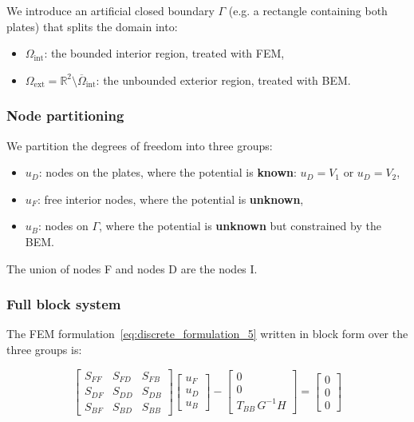 \documentclass[11pt,onecolumn]{article}
\begin{document}
We introduce an artificial closed boundary $\Gamma$ (e.g. a rectangle containing both plates) 
that splits the domain into:
\begin{itemize}
    \item $\Omega_{\text{int}}$: the bounded interior region, treated with FEM,
    \item $\Omega_{\text{ext}} = \mathbb{R}^2 \setminus \overline{\Omega}_{\text{int}}$: 
    the unbounded exterior region, treated with BEM.
\end{itemize}

\subsubsection{Node partitioning}

We partition the degrees of freedom into three groups:
\begin{itemize}
    \item $u_D$: nodes on the plates, where the potential is \textbf{known}: $u_D = V_1$ or $u_D = V_2$,
    \item $u_F$: free interior nodes, where the potential is \textbf{unknown},
    \item $u_B$: nodes on $\Gamma$, where the potential is \textbf{unknown} but constrained by the BEM.
\end{itemize}

The union of nodes F and nodes D are the nodes I.

\subsubsection{Full block system}

The FEM formulation~\eqref{eq:discrete_formulation_5} written in block form over the three groups is:

\begin{equation}
\begin{bmatrix}
S_{FF} & S_{FD} & S_{FB} \\
S_{DF} & S_{DD} & S_{DB} \\
S_{BF} & S_{BD} & S_{BB}
\end{bmatrix}
\begin{bmatrix}
u_F \\ u_D \\ u_B
\end{bmatrix}
-
\begin{bmatrix}
0 \\ 0 \\ T_{BB}\,G^{-1}H
\end{bmatrix}
= \begin{bmatrix}
0 \\ 0 \\ 0
\end{bmatrix}
\label{eq:full_block_system}
\end{equation}
\end{document}
